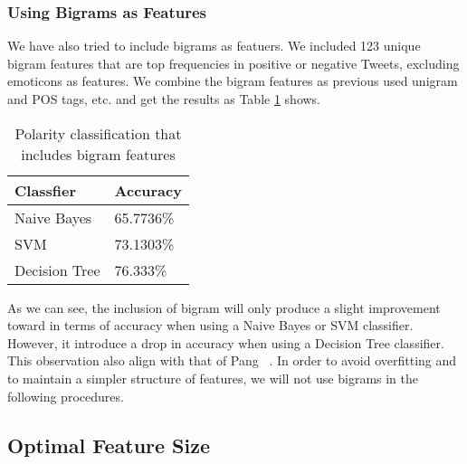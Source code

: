 \documentclass[12pt]{article}
\begin{document}

\subsubsection{Using Bigrams as Features}

We have also tried to include bigrams as featuers. We included 123 unique bigram features that are top frequencies in positive or negative Tweets, excluding emoticons as features. We combine the bigram features as previous used unigram and POS tags, etc. and get the results as Table \ref{bigrams-polarity} shows.

\begin{table}
\begin{center}
    \begin{tabular}{ | l || l | }
        \hline
        \textbf{Classfier} &  \textbf{Accuracy} \\ \hline
        \hline
        Naive Bayes &  65.7736\% \\ \hline
        SVM & 73.1303\% \\ \hline
        Decision Tree & 76.333\% \\ \hline
    \end{tabular}
\caption{Polarity classification that includes bigram features}
\label{bigrams-polarity}
\end{center}
\end{table}

As we can see, the inclusion of bigram will only produce a slight improvement toward in terms of accuracy when using a Naive Bayes or SVM classifier. However, it introduce a drop in accuracy when using a Decision Tree classifier. This observation also align with that of Pang \etal~\cite{Pang:02}. In order to avoid overfitting and to maintain a simpler structure of features, we will not use bigrams in the following procedures.

\subsection{Optimal Feature Size}
\end{document}

